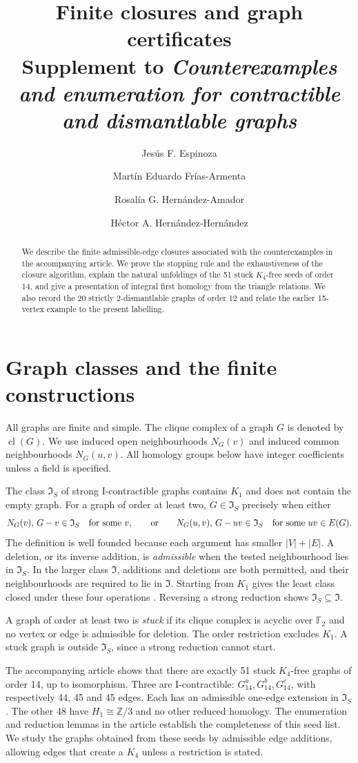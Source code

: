 \documentclass[11pt]{amsart}
\title[Finite closures and graph certificates]{Finite closures and graph certificates\\
Supplement to \emph{Counterexamples and enumeration for contractible and dismantlable graphs}}
\author[J. F. Espinoza]{Jes\'us F. Espinoza}
\author[M. E. Fr\'ias-Armenta]{Mart\'in Eduardo Fr\'ias-Armenta}
\author[R. G. Hern\'andez-Amador]{Rosal\'ia G. Hern\'andez-Amador}
\author[H. A. Hern\'andez-Hern\'andez]{H\'ector A. Hern\'andez-Hern\'andez}
\date{}
\newcommand{\I}{\mathfrak I}
\newcommand{\IS}{\mathfrak I_S}
\newcommand{\ZZ}{\mathbb Z}
\newcommand{\cl}{\operatorname{cl}}
\newcommand{\Ga}{G_{14}^{a}}
\newcommand{\Gb}{G_{14}^{b}}
\newcommand{\Gc}{G_{14}^{c}}
\theoremstyle{definition}
\begin{document}
\begin{abstract}
We describe the finite admissible-edge closures associated with the
counterexamples in the accompanying article. We prove the stopping rule
and the exhaustiveness of the closure algorithm, explain the natural
unfoldings of the 51 stuck $K_4$-free seeds of order 14, and give a presentation of integral
first homology from the triangle relations. We also record the
20 strictly 2-dismantlable graphs of order 12 and relate the earlier
15-vertex example to the present labelling.
\end{abstract}
\maketitle

\section{Graph classes and the finite constructions}
All graphs are finite and simple. The clique complex of a graph $G$ is
denoted by $\cl(G)$. We use induced open neighbourhoods $N_G(v)$ and
induced common neighbourhoods $N_G(u,v)$. All homology groups below have
integer coefficients unless a field is specified.

The class $\IS$ of strong I-contractible graphs contains $K_1$ and does
not contain the empty graph. For a graph of order at least two,
$G\in\IS$ precisely when either
\[
 N_G(v),\,G-v\in\IS\quad\hbox{for some }v,
 \qquad\hbox{or}\qquad
 N_G(u,v),\,G-uv\in\IS\quad\hbox{for some }uv\in E(G).
\]
The definition is well founded because each argument has smaller
$|V|+|E|$. A deletion, or its inverse addition, is \emph{admissible}
when the tested neighbourhood lies in $\IS$.
In the larger class $\I$, additions and deletions are both permitted,
and their neighbourhoods are required to lie in $\I$.
Starting from $K_1$ gives the least class closed under these four
operations \cite{DEFH2023}. Reversing a strong reduction shows
$\IS\subseteq\I$.

A graph of order at least two is \emph{stuck} if its clique complex is
acyclic over $\mathbb F_2$ and no vertex or edge is admissible for
deletion. The order restriction excludes $K_1$. A stuck graph is
outside $\IS$, since a strong reduction cannot start.

The accompanying article \cite{companion2026} shows that there are
exactly 51 stuck $K_4$-free graphs of order 14, up to isomorphism. Three are I-contractible:
$\Ga,\Gb,\Gc$, with respectively 44, 45 and 45 edges. Each has an
admissible one-edge extension in $\IS$. The other 48 have
$H_1\cong\ZZ/3$ and no other reduced homology.
The enumeration and reduction lemmas in the article establish the
completeness of this seed list. We study the graphs obtained from
these seeds by admissible edge additions, allowing edges that create
a $K_4$ unless a restriction is stated.
\end{document}
